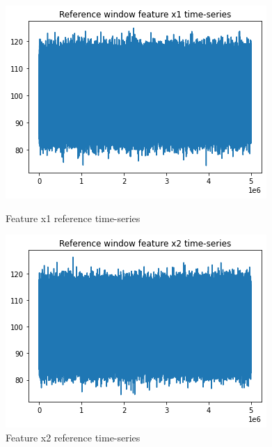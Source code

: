 \begin{figure}[!htb] 
  \begin{minipage}[b]{0.5\linewidth}
    \centering
    \includegraphics[width=1\linewidth]{figures/timeseries-r6-x1.png} 
    \caption{Feature x1 reference time-series} 
    \label{fig:timeseries-r6-x1} 
    \vspace{4ex}
  \end{minipage}%
  \begin{minipage}[b]{0.5\linewidth}
    \centering
    \includegraphics[width=1\linewidth]{figures/timeseries-r6-x2.png} 
    \caption{Feature x2 reference time-series} 
    \label{fig:timeseries-r6-x2} 
    \vspace{4ex}
  \end{minipage} 

\end{figure}
